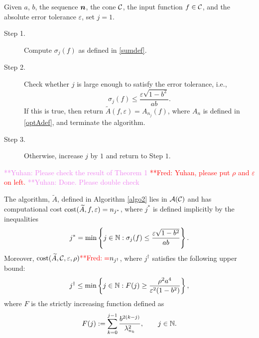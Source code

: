 \documentclass[graybox,footinfo]{svmult}
\newcommand{\frednote}[1]{  {\textcolor{red}  {\mbox{**Fred:} #1}}}
\newcommand{\yuhannote}[1]{ {\textcolor{violet}  {\mbox{**Yuhan:} #1}}}
\begin{document}
\begin{algo}\label{algo2}
Given $a$, $b$, the sequence ${\boldsymbol{n}}$, the cone ${\mathcal{C}}$, the input function $f \in {\mathcal{C}}$, and the absolute error tolerance $\varepsilon$, set $j=1$.
\begin{description}
\item[Step 1.] Compute $\sigma_{j}(f)$ as defined in \eqref{sumdef}.
\item[Step 2.] Check whether $j$ is large enough to satisfy the error tolerance, i.e.,
    \begin{equation*}\label{covcrit}
          \sigma_{j}(f) \le \frac{\varepsilon\sqrt{1 - b^2}}{ab} .
    \end{equation*}
    If this is true, then return $\widetilde{A}(f,\varepsilon) = A_{n_{j}}(f)$, where $A_n$ is defined in \eqref{optAdef}, and terminate the algorithm.
\item[Step 3.] Otherwise, increase $j$ by $1$ and return to Step $1$.
\end{description}
\end{algo}
\yuhannote{Please check the result of Theorem 1} \frednote{Yuhan, please put $\rho$ and $\varepsilon$ on left.}\yuhannote{Done. Please double check}
\begin{theorem}\label{thm:compcost}
The algorithm, $\widetilde{A}$, defined in Algorithm \ref{algo2} lies in ${\mathcal{A}}({\mathcal{C}})$ and has computational cost $\textup{cost}(\widetilde{A},f,\varepsilon)=n_{j^*}$, where $j^*$ is defined implicitly by the inequalities 
\begin{equation} \label{eq:OurAlgjstar}
j^* = \min\left \{ j \in \bbN : \sigma_{j}(f) \le \frac{\varepsilon\sqrt{1 - b^2}}{ab}  \right\}.
\end{equation}
Moreover, $\textup{cost}(\widetilde{A},\calC,\varepsilon,\rho) \frednote{=} n_{j^\dagger}$, where $j^\dagger$ satisfies the following upper bound:
\begin{equation} \label{jdagger}
j^\dagger \le \min \left \{j \in \bbN : F(j) \ge \frac{\rho^2 a^4}{\varepsilon^2(1 - b^2)} \right\},
\end{equation}
where $F$ is the strictly increasing function defined as
\begin{equation} \label{jsum}
F(j): = \sum_{k=0}^{j-1} \frac{b^{2(k-j)}}{\lambda_{n_{k}}^2}, \qquad j \in \N.
\end{equation}
\end{theorem}
\end{document}
